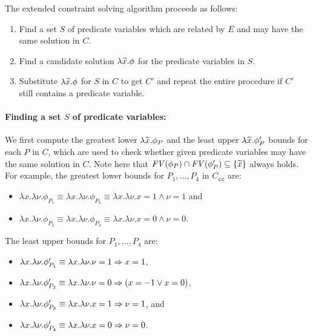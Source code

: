 
The extended constraint solving algorithm proceeds as follows:
\begin{enumerate}
\item Find a set \(S\) of predicate variables which are related by \(E\) 
and may have the same solution in \(C\).
\item Find a candidate solution \(\lambda \widetilde{x}.\phi\) for the
predicate variables in \(S\).
\item Substitute \(\lambda \widetilde{x}.\phi\) for \(S\) in \(C\) to get
\(C'\) and repeat the entire procedure if \(C'\) still contains a
predicate variable.
\end{enumerate}

\paragraph{Finding a set \(S\) of predicate variables:}
We first compute the greatest lower \(\lambda \widetilde{x}.\phi_P\) and the 
least upper \(\lambda \widetilde{x}.\phi_P'\) bounds for each \(P\) in \(C\), 
which are used to check whether given predicate variables may have the 
same solution in \(C\).  Note here that \(\mathit{FV}({\phi_P}) \cap \mathit{FV}({\phi_P'}) 
\subseteq \{{\widetilde{x}}\}\) always holds.
%
For example, the greatest lower bounds for \(P_1,\dots,P_4\) in
\(C_{\texttt{cc}}\) are:
\vspace{-4pt}
\begin{itemize}
\item \(\lambda x.\lambda \nu.\phi_{P_1} \equiv \lambda x.\lambda \nu.\phi_{P_3} \equiv \lambda x.\lambda \nu.x=1 \land \nu=1\) and
\item \(\lambda x.\lambda \nu.\phi_{P_2} \equiv \lambda x.\lambda \nu.\phi_{P_4} \equiv \lambda x.\lambda \nu.x=0 \land \nu=0\).
\end{itemize}
\vspace{-4pt}
The least upper bounds for \(P_1,\dots,P_4\) are:
\vspace{-4pt}
\begin{itemize}
\item \(\lambda x.\lambda \nu.\phi_{P_1}'\equiv \lambda x.\lambda \nu.\nu=1 \Rightarrow x=1\),
\item \(\lambda x.\lambda \nu.\phi_{P_2}'\equiv \lambda x.\lambda \nu.\nu=0 \Rightarrow (x=-1 \lor x=0)\),
\item \(\lambda x.\lambda \nu.\phi_{P_3}'\equiv \lambda x.\lambda \nu.x=1 \Rightarrow \nu=1\), and
\item \(\lambda x.\lambda \nu.\phi_{P_4}'\equiv \lambda x.\lambda \nu.x=0 \Rightarrow \nu=0\).
\end{itemize}
\vspace{-4pt}


